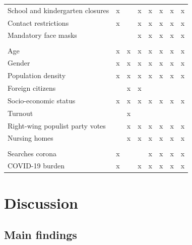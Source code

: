 \documentclass[]{elsarticle} %
\begin{document}
\begin{table}
\begin{tabular}[t]{llllllll}
\hspace{1em}School and kindergarten closures & x &  & x & x & x & x & x\\
\hspace{1em}Contact restrictions & x &  & x & x & x & x & x\\
\hspace{1em}Mandatory face masks &  &  & x & x & x & x & x\\
\addlinespace[0.3em]
\multicolumn{8}{l}{\textbf{Socio-demographic}}\\
\hspace{1em}Age & x & x & x & x & x & x & x\\
\hspace{1em}Gender & x & x & x & x & x & x & x\\
\hspace{1em}Population density & x & x & x & x & x & x & x\\
\hspace{1em}Foreign citizens &  & x & x &  &  &  & \\
\hspace{1em}Socio-economic status & x & x & x & x & x & x & x\\
\hspace{1em}Turnout &  & x &  &  &  &  & \\
\hspace{1em}Right-wing populist party votes &  & x & x & x & x & x & x\\
\hspace{1em}Nursing homes &  & x & x & x & x & x & x\\
\addlinespace[0.3em]
\multicolumn{8}{l}{\textbf{Awareness}}\\
\hspace{1em}Searches corona & x &  &  & x & x & x & x\\
\hspace{1em}COVID-19 burden & x &  & x & x & x & x & x\\
\bottomrule
\end{tabular}
\end{table}

\section{Discussion}\label{discussion}

\subsection{Main findings}\label{main-findings}
\end{document}

